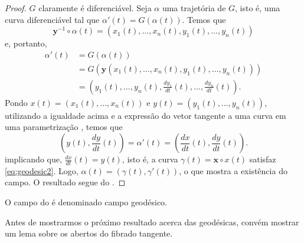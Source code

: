 \begin{lemma}
\begin{proof}
        $G$ claramente é diferenciável. Seja $\alpha$ uma trajetória de $G$, isto é, uma curva diferenciável tal que $\alpha'(t)=G(\alpha(t))$. Temos que
        \begin{equation*}
            \mathbf{y}^{-1} \circ  \alpha(t) = (x_{1}(t), \dots, x_{n}(t), y_{1}(t), \dots, y_{n}(t))
        \end{equation*}
        e, portanto,
        \begin{align*}
            \alpha'(t) & =G(\alpha(t))                                                                                 \\
                       & =G(\mathbf{y}(x_{1}(t), \dots, x_{n}(t), y_{1}(t), \dots, y_{n}(t)))                          \\
                       & =\left( y_{1}(t), \dots, y_{n}(t), \frac{dy_{1}}{dt}(t), \dots, \frac{dy_{n}}{dt}(t) \right).
        \end{align*}
        Pondo $x(t)=(x_{1}(t), \dots, x_{n}(t))$ e $y(t) = (y_{1}(t), \dots, y_{n}(t))$, utilizando a igualdade acima e a expressão do vetor tangente a uma curva em uma parametrização \parencite[p.~8, def.~2.6, expressão (2)]{doCarmo1992}, temos que
        \begin{equation*}
            \left( y(t), \frac{dy}{dt}(t) \right)=\alpha'(t)=\left( \frac{dx}{dt}(t),\frac{dy}{dt}(t) \right).
        \end{equation*}
        implicando que, $\frac{dx}{dt}(t)=y(t)$, isto é, a curva $\gamma(t)=\mathbf{x} \circ x(t)$ satisfaz \eqref{eq:geodesic2}. Logo, $\alpha(t)=(\gamma(t), \gamma'(t))$, o que mostra a existência do campo.
        O resultado segue do .
    \end{proof}
\end{lemma}
\begin{definition}
    \label{def:campo-geodesico}
    O campo do  é denominado campo geodésico.
\end{definition}
Antes de mostrarmos o próximo resultado acerca das geodésicas, convém mostrar um lema sobre os abertos do fibrado tangente.
